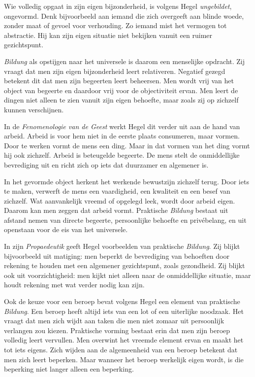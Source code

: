 Wie volledig opgaat in zijn eigen bijzonderheid, is volgens Hegel \textit{ungebildet}, ongevormd. Denk bijvoorbeeld aan iemand die zich overgeeft aan blinde woede, zonder maat of gevoel voor verhouding. Zo iemand mist het vermogen tot abstractie. Hij kan zijn eigen situatie niet bekijken vanuit een ruimer gezichtspunt.

\textit{Bildung} als opstijgen naar het universele is daarom een menselijke opdracht. Zij vraagt dat men zijn eigen bijzonderheid leert relativeren. Negatief gezegd betekent dit dat men zijn begeerten leert beheersen. Men wordt vrij van het object van begeerte en daardoor vrij voor de objectiviteit ervan. Men leert de dingen niet alleen te zien vanuit zijn eigen behoefte, maar zoals zij op zichzelf kunnen verschijnen.

In de \textit{Fenomenologie van de Geest} werkt Hegel dit verder uit aan de hand van arbeid. Arbeid is voor hem niet in de eerste plaats consumeren, maar vormen. Door te werken vormt de mens een ding. Maar in dat vormen van het ding vormt hij ook zichzelf. Arbeid is beteugelde begeerte. De mens stelt de onmiddellijke bevrediging uit en richt zich op iets dat duurzamer en algemener is.

In het gevormde object herkent het werkende bewustzijn zichzelf terug. Door iets te maken, verwerft de mens een vaardigheid, een kwaliteit en een besef van zichzelf. Wat aanvankelijk vreemd of opgelegd leek, wordt door arbeid eigen. Daarom kan men zeggen dat arbeid vormt. Praktische \textit{Bildung} bestaat uit afstand nemen van directe begeerte, persoonlijke behoefte en privébelang, en uit openstaan voor de eis van het universele.

In zijn \textit{Propaedeutik} geeft Hegel voorbeelden van praktische \textit{Bildung}. Zij blijkt bijvoorbeeld uit matiging: men beperkt de bevrediging van behoeften door rekening te houden met een algemener gezichtspunt, zoals gezondheid. Zij blijkt ook uit voorzichtigheid: men kijkt niet alleen naar de onmiddellijke situatie, maar houdt rekening met wat verder nodig kan zijn.

Ook de keuze voor een beroep bevat volgens Hegel een element van praktische \textit{Bildung}. Een beroep heeft altijd iets van een lot of een uiterlijke noodzaak. Het vraagt dat men zich wijdt aan taken die men niet zomaar uit persoonlijk verlangen zou kiezen. Praktische vorming bestaat erin dat men zijn beroep volledig leert vervullen. Men overwint het vreemde element ervan en maakt het tot iets eigens. Zich wijden aan de algemeenheid van een beroep betekent dat men zich leert beperken. Maar wanneer het beroep werkelijk eigen wordt, is die beperking niet langer alleen een beperking.

